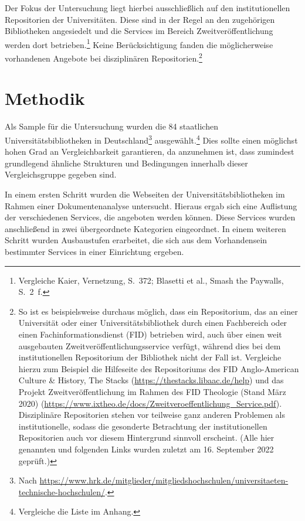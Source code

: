\documentclass[a4paper,
fontsize=11pt,
oneside,
numbers=noperiodatend,
parskip=half-,
bibliography=totoc,
final
]{scrartcl}
\begin{document}
Der Fokus der Untersuchung liegt hierbei ausschließlich auf den
institutionellen Repositorien der Universitäten. Diese sind in der Regel
an den zugehörigen Bibliotheken angesiedelt und die Services im Bereich
Zweitveröffentlichung werden dort betrieben.\footnote{Vergleiche Kaier,
  Vernetzung, S.~372; Blasetti et al., Smash the Paywalls, S.~2~f.}
Keine Berücksichtigung fanden die möglicherweise vorhandenen Angebote
bei disziplinären Repositorien.\footnote{So ist es beispielsweise
  durchaus möglich, dass ein Repositorium, das an einer Universität oder
  einer Universitätsbibliothek durch einen Fachbereich oder einen
  Fachinformationsdienst (FID) betrieben wird, auch über einen weit
  ausgebauten Zweitveröffentlichungsservice verfügt, während dies bei
  dem institutionellen Repositorium der Bibliothek nicht der Fall ist.
  Vergleiche hierzu zum Beispiel die Hilfeseite des Repositoriums des
  FID Anglo-American Culture \& History, The Stacks
  (\url{https://thestacks.libaac.de/help}) und das Projekt
  Zweitveröffentlichung im Rahmen des FID Theologie (Stand März 2020)
  (\url{https://www.ixtheo.de/docs/Zweitveroeffentlichung_Service.pdf}).
  Disziplinäre Repositorien stehen vor teilweise ganz anderen Problemen
  als institutionelle, sodass die gesonderte Betrachtung der
  institutionellen Repositorien auch vor diesem Hintergrund sinnvoll
  erscheint. (Alle hier genannten und folgenden Links wurden zuletzt am
  16. September 2022 geprüft.)}

\hypertarget{methodik}{%
\section{Methodik}\label{methodik}}

Als Sample für die Untersuchung wurden die 84 staatlichen
Universitätsbibliotheken in Deutschland\footnote{Nach
  \url{https://www.hrk.de/mitglieder/mitgliedshochschulen/universitaeten-technische-hochschulen/}.}
ausgewählt.\footnote{Vergleiche die Liste im Anhang.} Dies sollte einen
möglichst hohen Grad an Vergleichbarkeit garantieren, da anzunehmen ist,
dass zumindest grundlegend ähnliche Strukturen und Bedingungen innerhalb
dieser Vergleichsgruppe gegeben sind.

In einem ersten Schritt wurden die Webseiten der
Universitätsbibliotheken im Rahmen einer Dokumentenanalyse untersucht.
Hieraus ergab sich eine Auflistung der verschiedenen Services, die
angeboten werden können. Diese Services wurden anschließend in zwei
übergeordnete Kategorien eingeordnet. In einem weiteren Schritt wurden
Ausbaustufen erarbeitet, die sich aus dem Vorhandensein bestimmter
Services in einer Einrichtung ergeben.
\end{document}
